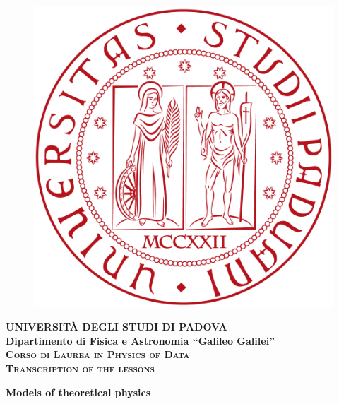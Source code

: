 
\begin{titlepage}
\vspace{5mm}
\begin{figure}[hbtp]
\centering
\includegraphics[scale=.13]{../frontespizio/UNIPD.png}
\end{figure}
\vspace{5mm}
\begin{center}
{{\huge{\textsc{\bf UNIVERSIT\`A DEGLI STUDI DI PADOVA}}}\\}
\vspace{5mm}
{\Large{\bf Dipartimento di Fisica e Astronomia ``Galileo Galilei''}} \\
\vspace{5mm}
{\Large{\textsc{\bf Corso di Laurea in Physics of Data}}}\\
\vspace{20mm}
{\Large{\textsc{\bf Transcription of the lessons}}}\\
\vspace{30mm}
\begin{spacing}{3}
{\LARGE \textbf{Models of theoretical physics}}\\
\end{spacing}
\vspace{8mm}
\end{center}


\end{titlepage}
